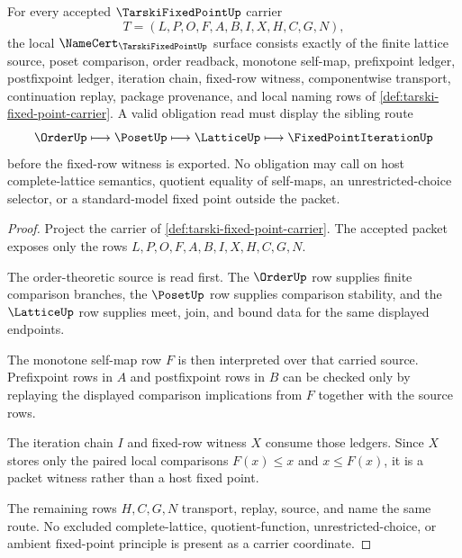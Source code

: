 \begin{theorem}
\label{thm:tarski-fixed-point-namecert-obligations}
For every accepted $\TarskiFixedPointUp$ carrier
$$
T=(L,P,O,F,A,B,I,X,H,C,G,N),
$$
the local $\NameCert_{\TarskiFixedPointUp}$ surface consists exactly of the finite lattice source, poset comparison, order readback, monotone self-map, prefixpoint ledger, postfixpoint ledger, iteration chain, fixed-row witness, componentwise transport, continuation replay, package provenance, and local naming rows of \autoref{def:tarski-fixed-point-carrier}. A valid obligation read must display the sibling route
$$
\OrderUp \longmapsto \PosetUp \longmapsto \LatticeUp \longmapsto \FixedPointIterationUp
$$
before the fixed-row witness is exported. No obligation may call on host complete-lattice semantics, quotient equality of self-maps, an unrestricted-choice selector, or a standard-model fixed point outside the packet.
\end{theorem}
\begin{proof}
Project the carrier of \autoref{def:tarski-fixed-point-carrier}. The accepted packet exposes only the rows $L,P,O,F,A,B,I,X,H,C,G,N$.

The order-theoretic source is read first. The $\OrderUp$ row supplies finite comparison branches, the $\PosetUp$ row supplies comparison stability, and the $\LatticeUp$ row supplies meet, join, and bound data for the same displayed endpoints.

The monotone self-map row $F$ is then interpreted over that carried source. Prefixpoint rows in $A$ and postfixpoint rows in $B$ can be checked only by replaying the displayed comparison implications from $F$ together with the source rows.

The iteration chain $I$ and fixed-row witness $X$ consume those ledgers. Since $X$ stores only the paired local comparisons $F(x) \leq x$ and $x \leq F(x)$, it is a packet witness rather than a host fixed point.

The remaining rows $H,C,G,N$ transport, replay, source, and name the same route. No excluded complete-lattice, quotient-function, unrestricted-choice, or ambient fixed-point principle is present as a carrier coordinate.
\end{proof}

